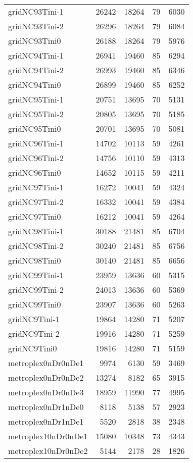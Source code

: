 \begin{longtable}{lrrrr}
gridNC93Tini-1 & 26242 & 18264 & 79 & 6030 \\
gridNC93Tini-2 & 26296 & 18264 & 79 & 6084 \\
gridNC93Tini0 & 26188 & 18264 & 79 & 5976 \\
gridNC94Tini-1 & 26941 & 19460 & 85 & 6294 \\
gridNC94Tini-2 & 26993 & 19460 & 85 & 6346 \\
gridNC94Tini0 & 26899 & 19460 & 85 & 6252 \\
gridNC95Tini-1 & 20751 & 13695 & 70 & 5131 \\
gridNC95Tini-2 & 20805 & 13695 & 70 & 5185 \\
gridNC95Tini0 & 20701 & 13695 & 70 & 5081 \\
gridNC96Tini-1 & 14702 & 10113 & 59 & 4261 \\
gridNC96Tini-2 & 14756 & 10110 & 59 & 4313 \\
gridNC96Tini0 & 14652 & 10115 & 59 & 4211 \\
gridNC97Tini-1 & 16272 & 10041 & 59 & 4324 \\
gridNC97Tini-2 & 16332 & 10041 & 59 & 4384 \\
gridNC97Tini0 & 16212 & 10041 & 59 & 4264 \\
gridNC98Tini-1 & 30188 & 21481 & 85 & 6704 \\
gridNC98Tini-2 & 30240 & 21481 & 85 & 6756 \\
gridNC98Tini0 & 30140 & 21481 & 85 & 6656 \\
gridNC99Tini-1 & 23959 & 13636 & 60 & 5315 \\
gridNC99Tini-2 & 24013 & 13636 & 60 & 5369 \\
gridNC99Tini0 & 23907 & 13636 & 60 & 5263 \\
gridNC9Tini-1 & 19864 & 14280 & 71 & 5207 \\
gridNC9Tini-2 & 19916 & 14280 & 71 & 5259 \\
gridNC9Tini0 & 19816 & 14280 & 71 & 5159 \\
metroplex0nDr0nDe1 & 9974 & 6130 & 59 & 3469 \\
metroplex0nDr0nDe2 & 13274 & 8182 & 65 & 3915 \\
metroplex0nDr0nDe3 & 18959 & 11990 & 77 & 4995 \\
metroplex0nDr1nDe0 & 8118 & 5138 & 57 & 2923 \\
metroplex0nDr1nDe1 & 5520 & 2818 & 38 & 2348 \\
metroplex10nDr0nDe1 & 15080 & 10348 & 73 & 4343 \\
metroplex10nDr0nDe2 & 5144 & 2178 & 28 & 1826 \\

\end{longtable}

